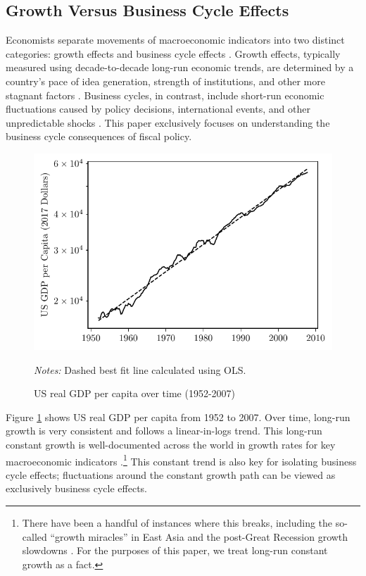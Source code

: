 \subsection{Growth Versus Business Cycle Effects} \label{subsec:detrend}

Economists separate movements of macroeconomic indicators into two distinct categories: growth effects and business cycle effects \parencite{stulz1985macroeconomic}. Growth effects, typically measured using decade-to-decade long-run economic trends, are determined by a country's pace of idea generation, strength of institutions, and other more stagnant factors \parencites{acemoglu2001colonial}{jones2016facts}{jones2019paul}. Business cycles, in contrast, include short-run economic fluctuations caused by policy decisions, international events, and other unpredictable shocks \parencites{lucas1995understanding}{mitchell2024business}. This paper exclusively focuses on understanding the business cycle consequences of fiscal policy.

\begin{figure}[t]
    \centering
    \caption{US real GDP per capita over time (1952-2007)}
    \includegraphics{figures/growth_effects.pdf}

    {\scriptsize \emph{Notes:} Dashed best fit line calculated using OLS.}
    \label{fig:growth-effects}
\end{figure}

Figure \ref{fig:growth-effects} shows US real GDP per capita from 1952 to 2007. Over time, long-run growth is very consistent and follows a linear-in-logs trend. This long-run constant growth is well-documented across the world in growth rates for key macroeconomic indicators \parencites{papell2014long}.\footnote{There have been a handful of instances where this breaks, including the so-called ``growth miracles'' in East Asia \parencite{easterly199511} and the post-Great Recession growth slowdowns \parencites{benigno2018stagnation}. For the purposes of this paper, we treat long-run constant growth as a fact.} This constant trend is also key for isolating business cycle effects; fluctuations around the constant growth path can be viewed as exclusively business cycle effects.

